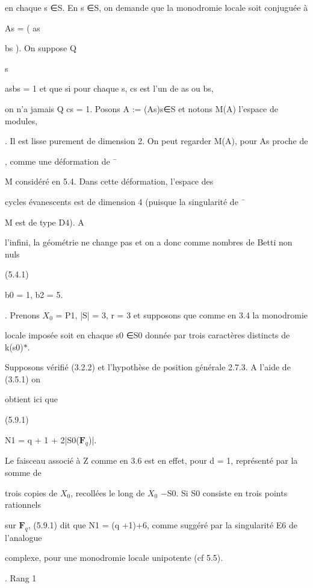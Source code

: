 \documentclass[11pt]{article}
\begin{document}
\noindent en chaque s ∈S. En s ∈S, on demande que la monodromie locale soit conjuguée à\par
\noindent As = ( as\par
\noindent bs ). On suppose Q\par
\noindent s\par
\noindent asbs = 1 et que si pour chaque s, cs est l’un de as ou bs,\par
\noindent on n’a jamais Q cs = 1. Posons A := (As)s∈S et notons M(A) l’espace de modules,\par
{}. Il est lisse purement de dimension 2. On peut regarder M(A), pour As proche de\par
{}, comme une déformation de ¯\par
\noindent M considéré en 5.4. Dans cette déformation, l’espace des\par
\noindent cycles évanescents est de dimension 4 (puisque la singularité de ¯\par
\noindent M est de type D4). A\par
\noindent l’infini, la géométrie ne change pas et on a donc comme nombres de Betti non nuls\par
\noindent (5.4.1)\par
\noindent b0 = 1, b2 = 5.\par
{}. Prenons \(X_0\) = P1, |S| = 3, r = 3 et supposons que comme en 3.4 la monodromie\par
\noindent locale imposée soit en chaque s0 ∈S0 donnée par trois caractères distincts de k(s0)\(*\).\par
\noindent Supposons vérifié (3.2.2) et l’hypothèse de position générale 2.7.3. A l’aide de (3.5.1) on\par
\noindent obtient ici que\par
\noindent (5.9.1)\par
\noindent N1 = q + 1 + 2|S0(\(\mathbf F_q\))|.\par
\noindent Le faisceau associé à Z comme en 3.6 est en effet, pour d = 1, représenté par la somme de\par
\noindent trois copies de \(X_0\), recollées le long de \(X_0\) −S0. Si S0 consiste en trois points rationnels\par
\noindent sur \(\mathbf F_q\), (5.9.1) dit que N1 = (q +1)+6, comme suggéré par la singularité E6 de l’analogue\par
\noindent complexe, pour une monodromie locale unipotente (cf 5.5).\par
{}. Rang 1\par
\end{document}
